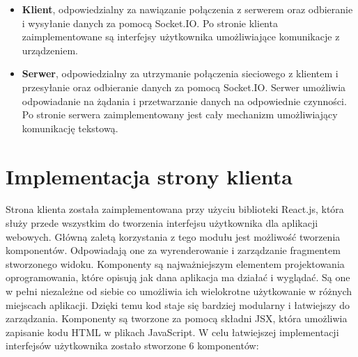 \begin{itemize}  
	\item \textbf{ Klient}, odpowiedzialny za nawiązanie połączenia z serwerem oraz odbieranie i wysyłanie danych za pomocą Socket.IO. Po stronie klienta zaimplementowane są interfejsy użytkownika umożliwiające komunikacje z urządzeniem.
	\\
	\item \textbf{ Serwer}, odpowiedzialny za utrzymanie połączenia sieciowego z klientem i przesyłanie oraz odbieranie danych za pomocą Socket.IO. Serwer umożliwia odpowiadanie na żądania i przetwarzanie danych na odpowiednie czynności. Po stronie serwera zaimplementowany jest cały mechanizm umożliwiający komunikację tekstową. 
	\\
\end{itemize}
\section{Implementacja strony klienta}
Strona klienta została zaimplementowana przy użyciu biblioteki React.js, która służy przede wszystkim do tworzenia interfejsu użytkownika dla aplikacji webowych. Główną zaletą korzystania z tego modułu jest możliwość tworzenia komponentów. Odpowiadają one za wyrenderowanie i zarządzanie fragmentem stworzonego widoku. Komponenty są najważniejszym elementem projektowania oprogramowania, które opisują jak dana aplikacja ma działać i wyglądać. Są one w pełni niezależne od siebie co umożliwia ich wielokrotne użytkowanie w różnych miejscach aplikacji. Dzięki temu kod staje się bardziej modularny i łatwiejszy do zarządzania. Komponenty są tworzone za pomocą składni JSX, która umożliwia zapisanie kodu HTML w plikach JavaScript. W celu łatwiejszej implementacji interfejsów użytkownika zostało stworzone 6 komponentów:
